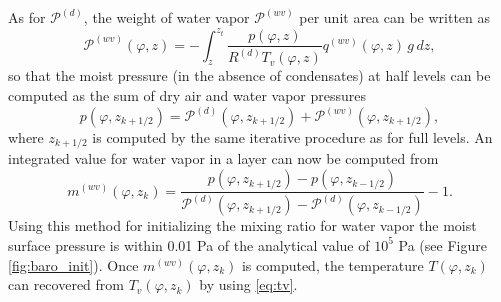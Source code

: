 \documentclass{agujournal}
\begin{document}
{As for $\mathcal{P}^{(d)}$, the weight of water vapor $\mathcal{P}^{(wv)}$ per unit area can be written as
\begin{equation}
{\mathcal{P}}^{(wv)}(\varphi,z)=-\int_z^{z_t}\frac{p(\varphi,z)}{R^{(d)} T_v(\varphi,z)}q^{(wv)}(\varphi,z)\, g\, dz,\label{eq:Upvw}
\end{equation}
so that the moist pressure (in the absence of condensates) at half levels can be computed as the sum of dry air and water vapor pressures
\begin{equation}
p(\varphi,z_{k+1/2})={\mathcal{P}}^{(d)}(\varphi,z_{k+1/2})+{\mathcal{P}}^{(wv)}(\varphi,z_{k+1/2}),
\end{equation}
where $z_{k+1/2}$ is computed by the same iterative procedure as for full levels. An integrated value for water vapor in a layer can now be computed from
\begin{equation}
m^{(wv)}(\varphi,z_k)=\frac{p(\varphi,z_{k+1/2})-p(\varphi,z_{k-1/2})}{{\mathcal{P}}^{(d)}(\varphi,z_{k+1/2})-{\mathcal{P}}^{(d)}(\varphi,z_{k-1/2})}-1.
\end{equation}
Using this method for initializing the mixing ratio for water vapor the moist surface pressure is within 0.01 Pa of the analytical value of $10^5$ Pa (see Figure \ref{fig:baro_init}). Once $m^{(wv)}(\varphi,z_k)$ is computed, the temperature $T(\varphi,z_k)$ can recovered from $T_v(\varphi,z_k)$ by using \eqref{eq:tv}.

}
\end{document}
